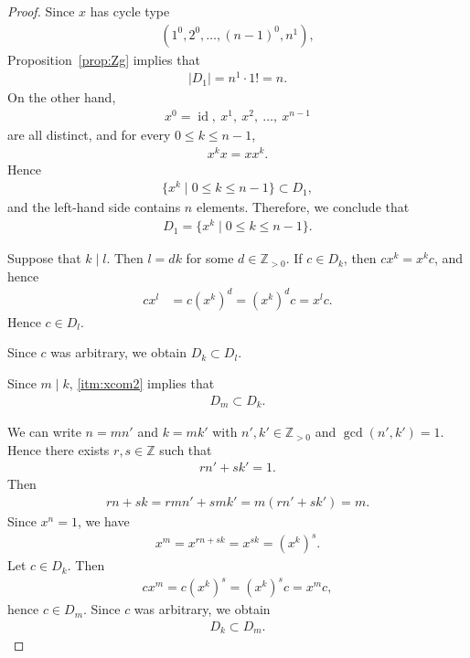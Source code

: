\documentclass[12pt,reqno]{amsart}
\newcommand{\Z}{\mathbb{Z}}								%
\newcommand{\Zp}{\mathbb{Z}_{> 0}}						%
\newcommand{\HL}{\vspace{2mm}}							%
\newcommand{\vt}[1]{\left\lvert #1 \right\rvert}					%
\DeclareMathOperator{\id}{id}								%
\theoremstyle{mythmstyle}
\theoremstyle{mydefstyle}
\newcommand{\propref}[1]{Proposition~\ref{#1}}
\numberwithin{equation}{section}
\begin{document}
\begin{proof}
\item[\ref{itm:xcom1}] Since $x$ has cycle type
\begin{align}
(1^{0}, 2^{0}, \ldots, (n-1)^{0}, n^{1}),
\end{align}
\propref{prop:Zg} implies that
\begin{align}
\vt{D_{1}} = n^{1}\cdot 1! = n.
\end{align}
On the other hand,
\begin{align}
 x^{0} = \id,\ x^{1},\ x^{2},\ \ldots,\ x^{n-1}
\end{align}
are all distinct, and for every $0 \le k \le n-1$,
\begin{align}
x^{k} x = x x^{k}.
\end{align}
Hence
\begin{align}
\{ x^{k} \mid 0 \le k \le n-1 \} \subset D_{1},
\end{align}
and the left-hand side contains $n$ elements. Therefore, we conclude that
\begin{align}
D_{1} = \{ x^{k} \mid 0 \le k \le n-1 \}.
\end{align}

\item[\ref{itm:xcom2}] Suppose that $k\mid l$.
Then $l = dk$ for some $d \in \Zp$.
If $c \in D_{k}$, then $c x^{k} = x^{k} c$, and hence
\begin{align}
c x^{l} &= c (x^{k})^{d} = (x^{k})^{d}c = x^{l}c.
\end{align}
Hence $c\in D_l$.

Since $c$ was arbitrary, we obtain $D_{k} \subset D_{l}$.
\HL

\item[\ref{itm:xcom3}] Since $m\mid k$, \ref{itm:xcom2} implies that
\begin{align}
\label{eq:Dmk}
D_{m} \subset D_{k}.
\end{align}

We can write $n = mn'$ and $k = mk'$ with $n', k' \in \Zp$ and $\gcd(n', k') = 1$. Hence there exists
$r, s \in \Z$ such that
\begin{align}
rn' + sk' = 1.
\end{align}
Then
\begin{align}
rn + sk = rmn' + smk' = m(rn'+sk') = m.
\end{align}
Since $x^n=1$, we have
\begin{align}
x^{m} = x^{rn+sk}=x^{sk}=(x^{k})^{s}.
\end{align}
Let $c \in D_{k}$. Then
\begin{align}
cx^{m} = c(x^{k})^{s} = (x^{k})^{s}c = x^{m}c,
\end{align}
hence $c \in D_{m}$. Since $c$ was arbitrary, we obtain
\begin{align}
\label{eq:Dkm}
D_{k} \subset D_{m}.
\end{align}


\end{proof}
\end{document}
